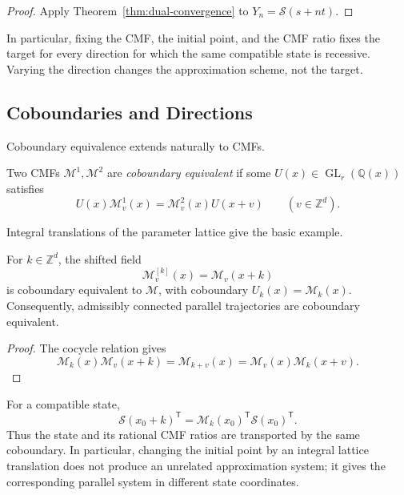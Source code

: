 \documentclass[oneside,english,11pt]{amsart}
\begin{document}
\begin{proof}
Apply Theorem~\ref{thm:dual-convergence} to
$Y_n=\mathcal S(s+nt)$.
\end{proof}

In particular, fixing the CMF, the initial point, and the CMF ratio fixes
the target for every direction for which the same compatible state is
recessive.  Varying the direction changes the approximation scheme,
not the target.




\subsection{Coboundaries and Directions}
\label{subsec:cmf-parameters}

Coboundary equivalence extends naturally to CMFs.

\begin{defn}
\label{def:cmf-coboundary}
Two CMFs $\mathcal M^1,\mathcal M^2$ are \emph{coboundary equivalent}
if some $U(x)\in\operatorname{GL}_r(\mathbb Q(x))$ satisfies
\[
    U(x)\mathcal M_v^1(x)
    =
    \mathcal M_v^2(x)U(x+v)
    \qquad(v\in\mathbb Z^d).
\]
\end{defn}

Integral translations of the parameter lattice give the basic example.

\begin{prop}
\label{prop:parallel-trajectories}
For $k\in\mathbb Z^d$, the shifted field
\[
    \mathcal M_v^{[k]}(x)=\mathcal M_v(x+k)
\]
is coboundary equivalent to $\mathcal M$, with coboundary
$U_k(x)=\mathcal M_k(x)$.  Consequently, admissibly connected parallel
trajectories are coboundary equivalent.
\end{prop}

\begin{proof}
The cocycle relation gives
\[
    \mathcal M_k(x)\mathcal M_v(x+k)
    =
    \mathcal M_{k+v}(x)
    =
    \mathcal M_v(x)\mathcal M_k(x+v).
\]
\end{proof}

For a compatible state,
\[
    \mathcal S(x_0+k)^{\mathsf T}
    =
    \mathcal M_k(x_0)^{\mathsf T}
    \mathcal S(x_0)^{\mathsf T}.
\]
Thus the state and its rational CMF ratios are transported by the same
coboundary.  In particular, changing the initial point by an integral
lattice translation does not produce an unrelated approximation
system; it gives the corresponding parallel system in different state
coordinates.
\end{document}
